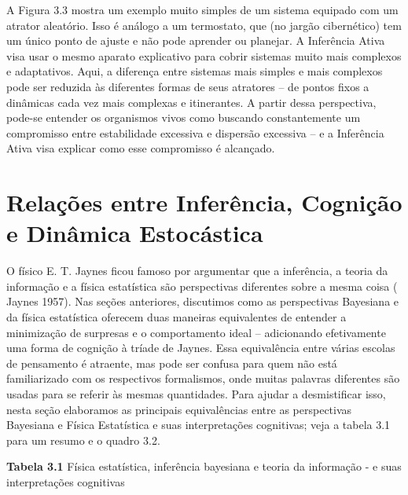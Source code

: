 \documentclass[
  12pt,
]{book}
\begin{document}
A Figura 3.3 mostra um exemplo muito simples de um sistema equipado com um atrator aleatório. Isso é análogo a um termostato, que (no jargão cibernético) tem um único ponto de ajuste e não pode aprender ou planejar. A Inferência Ativa visa usar o mesmo aparato explicativo para cobrir sistemas muito mais complexos e adaptativos. Aqui, a diferença entre sistemas mais simples e mais complexos pode ser reduzida às diferentes formas de seus atratores -- de pontos fixos a dinâmicas cada vez mais complexas e itinerantes. A partir dessa perspectiva, pode-se entender os organismos vivos como buscando constantemente um compromisso entre estabilidade excessiva e dispersão excessiva -- e a Inferência Ativa visa explicar como esse compromisso é alcançado.

\hypertarget{relauxe7uxf5es-entre-inferuxeancia-cogniuxe7uxe3o-e-dinuxe2mica-estocuxe1stica}{%
\section{Relações entre Inferência, Cognição e Dinâmica Estocástica}\label{relauxe7uxf5es-entre-inferuxeancia-cogniuxe7uxe3o-e-dinuxe2mica-estocuxe1stica}}

O físico E. T. Jaynes ficou famoso por argumentar que a inferência, a teoria da informação e a física estatística são perspectivas diferentes sobre a mesma coisa ( Jaynes 1957). Nas seções anteriores, discutimos como as perspectivas Bayesiana e da física estatística oferecem duas maneiras equivalentes de entender a minimização de surpresas e o comportamento ideal -- adicionando efetivamente uma forma de cognição à tríade de Jaynes. Essa equivalência entre várias escolas de pensamento é atraente, mas pode ser confusa para quem não está familiarizado com os respectivos formalismos, onde muitas palavras diferentes são usadas para se referir às mesmas quantidades. Para ajudar a desmistificar isso, nesta seção elaboramos as principais equivalências entre as perspectivas Bayesiana e Física Estatística e suas interpretações cognitivas; veja a tabela 3.1 para um resumo e o quadro 3.2.

\textbf{Tabela 3.1} Física estatística, inferência bayesiana e teoria da informação - e suas interpretações cognitivas
\end{document}

